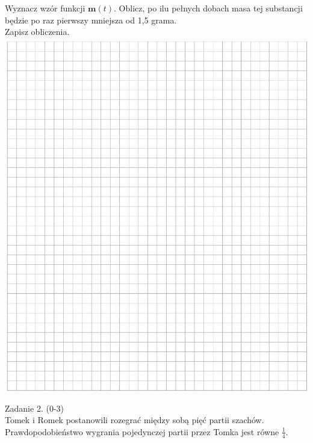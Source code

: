 \documentclass[10pt]{article}
\begin{document}
Wyznacz wzór funkcji \(\boldsymbol{m}(t)\). Oblicz, po ilu pełnych dobach masa tej substancji będzie po raz pierwszy mniejsza od 1,5 grama.\\
Zapisz obliczenia.\\
\includegraphics[max width=\textwidth, center]{2024_11_21_f1ecc00f5c4ab21f0d04g-04}

Zadanie 2. (0-3)\\
Tomek i Romek postanowili rozegrać między sobą pięć partii szachów. Prawdopodobieństwo wygrania pojedynczej partii przez Tomka jest równe \(\frac{1}{4}\).
\end{document}

